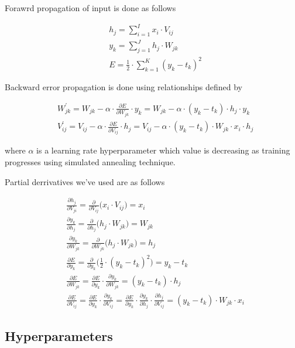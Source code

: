 \documentclass{article}
\begin{document}
Forawrd propagation of input is done as follows

\begin{align}
	&h_j = \sum_{i=1}^I x_i \cdot V_{ij} \\
	&y_k = \sum_{j=1}^J h_j \cdot W_{jk} \\
	&E = \frac{1}{2} \cdot \sum_{k=1}^K (y_k - t_k)^2
\end{align}

Backward error propagation is done using relationships defined by

\begin{align}
	&W_{jk}^\prime = W_{jk} - \alpha \cdot \frac{\partial E}{\partial W_{jk}}
	\cdot y_k = W_{jk} - \alpha \cdot (y_k - t_k) \cdot h_j \cdot y_k \\
	&V_{ij}^\prime = V_{ij} - \alpha \cdot \frac{\partial E}{\partial V_{ij}}
	\cdot h_j = V_{ij} - \alpha \cdot (y_k - t_k) \cdot W_{jk} \cdot x_i \cdot
	h_j
\end{align}

where $\alpha$ is a learning rate hyperparameter which value is decreasing as
training progresses using simulated annealing technique.

Partial derrivatives we've used are as follows

\begin{align}
	&\frac{\partial h_j}{\partial V_{ji}} = \frac{\partial}{\partial V_{ij}}
	\Big(x_i \cdot V_{ij}\Big) = x_i \\
	&\frac{\partial y_k}{\partial h_j} = \frac{\partial}{\partial h_j}
	\Big(h_j \cdot W_{jk}\Big) = W_{jk} \\
	&\frac{\partial y_k}{\partial W_{jk}} = \frac{\partial}{\partial W_{jk}}
	\Big(h_j \cdot W_{jk}\Big) = h_j \\
	&\frac{\partial E}{\partial y_k} = \frac{\partial}{\partial y_k}
	\Big(\frac{1}{2} \cdot (y_k - t_k)^2\Big) = y_k - t_k \\
	&\frac{\partial E}{\partial W_{jk}} = \frac{\partial E}{\partial y_k} \cdot
	\frac{\partial y_k}{\partial W_{jk}} = (y_k - t_k) \cdot h_j \\
	&\frac{\partial E}{\partial V_{ij}} = \frac{\partial E}{\partial y_k} \cdot
	\frac{\partial y_k}{\partial V_{ij}} = \frac{\partial E}{\partial y_k} \cdot
	\frac{\partial y_k}{\partial h_j} \cdot \frac{\partial h_j}{\partial V_{ij}}
	= (y_k - t_k) \cdot W_{jk} \cdot x_i
\end{align}

\subsection{Hyperparameters}
\end{document}
